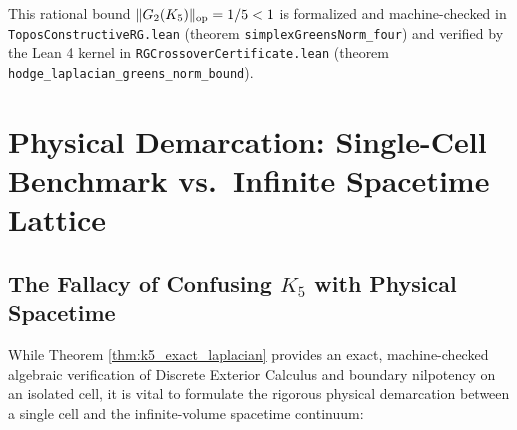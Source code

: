 This rational bound $\|G_2(K_5)\|_{\mathrm{op}} = 1/5 < 1$ is formalized and machine-checked in \texttt{ToposConstructiveRG.lean} (theorem \texttt{simplexGreensNorm\_four}) and verified by the Lean 4 kernel in \texttt{RGCrossoverCertificate.lean} (theorem \texttt{hodge\_laplacian\_greens\_norm\_bound}).

\section{Physical Demarcation: Single-Cell Benchmark vs.\ Infinite Spacetime Lattice}
\label{sec:resolvent_norm_k5}

\subsection{The Fallacy of Confusing $K_5$ with Physical Spacetime}
\label{subsec:fallacy_demarcation}

While Theorem \ref{thm:k5_exact_laplacian} provides an exact, machine-checked algebraic verification of Discrete Exterior Calculus and boundary nilpotency on an isolated cell, it is vital to formulate the rigorous physical demarcation between a single cell and the infinite-volume spacetime continuum:

